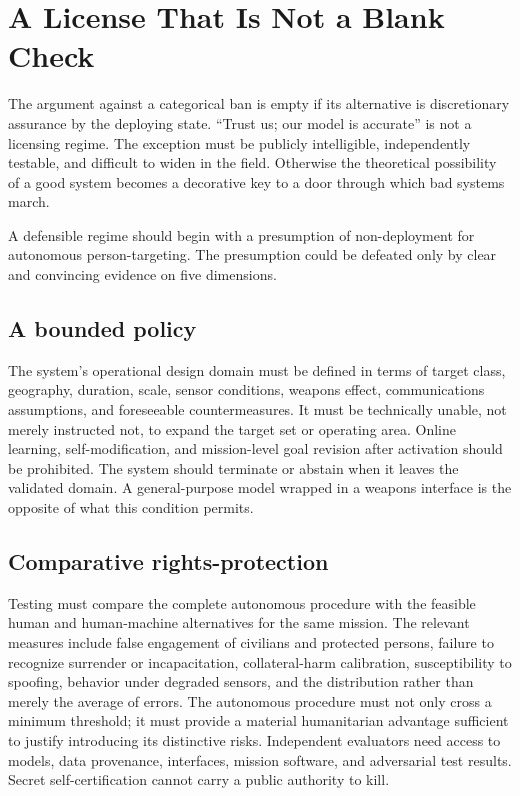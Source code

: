 \documentclass[11pt]{article}
\begin{document}
\section{A License That Is Not a Blank Check}
\label{sec:license}

The argument against a categorical ban is empty if its alternative is discretionary assurance by the deploying state. ``Trust us; our model is accurate'' is not a licensing regime. The exception must be publicly intelligible, independently testable, and difficult to widen in the field. Otherwise the theoretical possibility of a good system becomes a decorative key to a door through which bad systems march.

A defensible regime should begin with a presumption of non-deployment for autonomous person-targeting. The presumption could be defeated only by clear and convincing evidence on five dimensions.

\subsection{A bounded policy}

The system's operational design domain must be defined in terms of target class, geography, duration, scale, sensor conditions, weapons effect, communications assumptions, and foreseeable countermeasures. It must be technically unable, not merely instructed not, to expand the target set or operating area. Online learning, self-modification, and mission-level goal revision after activation should be prohibited. The system should terminate or abstain when it leaves the validated domain. A general-purpose model wrapped in a weapons interface is the opposite of what this condition permits.

\subsection{Comparative rights-protection}

Testing must compare the complete autonomous procedure with the feasible human and human-machine alternatives for the same mission. The relevant measures include false engagement of civilians and protected persons, failure to recognize surrender or incapacitation, collateral-harm calibration, susceptibility to spoofing, behavior under degraded sensors, and the distribution rather than merely the average of errors. The autonomous procedure must not only cross a minimum threshold; it must provide a material humanitarian advantage sufficient to justify introducing its distinctive risks. Independent evaluators need access to models, data provenance, interfaces, mission software, and adversarial test results. Secret self-certification cannot carry a public authority to kill.
\end{document}
